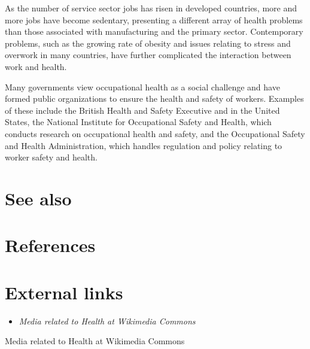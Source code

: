 As the number of service sector jobs has risen in developed countries,
more and more jobs have become sedentary, presenting a different array
of health problems than those associated with manufacturing and the
primary sector. Contemporary problems, such as the growing rate of
obesity and issues relating to stress and overwork in many countries,
have further complicated the interaction between work and health.

Many governments view occupational health as a social challenge and have
formed public organizations to ensure the health and safety of workers.
Examples of these include the British Health and Safety Executive and in
the United States, the National Institute for Occupational Safety and
Health, which conducts research on occupational health and safety, and
the Occupational Safety and Health Administration, which handles
regulation and policy relating to worker safety and health.

\section{See also}\label{see-also}

\section{References}\label{references}

\section{External links}\label{external-links}

\begin{itemize}
\item
  \emph{Media related to Health at Wikimedia Commons}
\end{itemize}

Media related to Health at Wikimedia Commons
